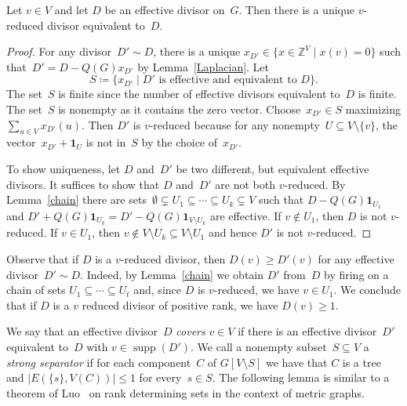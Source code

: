 \documentclass[ALCO,ThmDefs,Unicode,epreuves]{cedram}
\newcommand{\Z}{\ensuremath{\mathbb{Z}}}
\newcommand{\one}{\ensuremath{\mathbf{1}}}
\DeclareMathOperator{\supp}{supp}
\begin{document}
\begin{lemma}\label{reduction}
Let $v\in V$ and let $D$ be an effective divisor on~$G$. Then there is a unique $v$-reduced divisor equivalent to~$D$.
\end{lemma}

\begin{proof}
For any divisor~$D' \sim D$, there is a unique $x_{D'}\in \{x\in \Z^V\mid x(v)=0\}$ such that~$D'=D-Q(G)x_{D'}$ by Lemma~\ref{Laplacian}. Let 
\begin{equation}
S\coloneqq \{x_{D'}\mid D'\text{ is effective and equivalent to~$D$}\}.
\end{equation}
The set~$S$ is finite since the number of effective divisors equivalent to~$D$ is finite. The set~$S$ is nonempty as it contains the zero vector. Choose~$x_{D'}\in S$ maximizing $\sum_{u\in V} x_{D'}(u)$. Then $D'$ is $v$-reduced because for any nonempty~$U\subseteq V\setminus \{v\}$, the vector~$x_{D'}+\one_U$ is not in~$S$ by the choice of~$x_{D'}$. 

To show uniqueness, let $D$ and~$D'$ be two different, but equivalent effective divisors. It suffices to show that $D$ and~$D'$ are not both $v$-reduced. By Lemma~\ref{chain} there are sets~$\emptyset\subsetneq U_1\subseteq\cdots\subseteq U_k\subsetneq V$ such that $D-Q(G)\one_{U_1}$ and $D'+Q(G)\one_{U_k}=D'-Q(G)\one_{V\setminus U_k}$ are effective. If $v\not\in U_1$, then $D$ is not $v$-reduced. If $v\in U_1$, then $v\not\in V\setminus U_k\subseteq V\setminus U_1$ and hence $D'$ is not $v$-reduced.
\end{proof}
\begin{rema}
Observe that if $D$ is a $v$-reduced divisor, then $D(v)\geq D'(v)$ for any effective divisor~$D'\sim D$. Indeed, by Lemma~\ref{chain} we obtain $D'$ from~$D$ by firing on a chain of sets $U_1\subseteq\cdots\subseteq U_t$ and, since $D$ is $v$-reduced, we have $v\in U_1$. We conclude that if $D$ is a $v$ reduced divisor of positive rank, we have $D(v)\geq 1$. 
\end{rema}

We say that an effective divisor~$D$ \emph{covers} $v\in V$ if there is an effective divisor~$D'$ equivalent to~$D$ with $v\in \supp(D')$. We call a nonempty subset~$S\subseteq V$ a \emph{strong separator} if for each component~$C$ of $G[V\setminus S]$ we have that $C$ is a tree and $|E(\{s\},V(C))|\leq 1$ for every~$s\in S$. The following lemma is similar to a theorem of Luo~\cite{Luo2011} on rank determining sets in the context of metric graphs.
\end{document}
